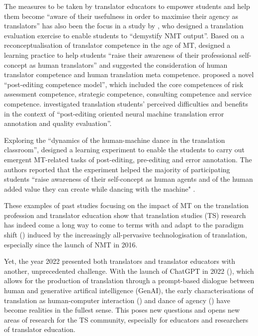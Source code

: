 \documentclass[output=paper,colorlinks,citecolor=brown]{langscibook}
\begin{document}
The measures to be taken by translator educators to empower students and help them become “aware of their usefulness in order to maximise their agency as translators” has also been the focus in a study by \citet[375--376]{Moorkens2018_expectNMT}, who designed a translation evaluation exercise to enable students to “demystify NMT output”. Based on a reconceptualisation of translator competence in the age of MT, \citet[3]{Senem2019} designed a learning practice to help students “raise their awareness of their professional self-concept as human translators” and suggested the consideration of human translator competence and human translation meta competence. \citet[248]{Nitzke2019} proposed a novel “post-editing competence model”, which included the core competences of risk assessment competence, strategic competence, consulting competence and service competence. \citet[100]{Isinsenem2021} investigated translation students’ perceived difficulties and benefits in the context of “post-editing oriented neural machine translation error annotation and quality evaluation”.

Exploring the “dynamics of the human-machine dance in the translation classroom”, \citet[377]{SenemMilufer2023} designed a learning experiment to enable the students to carry out emergent MT-related tasks of post-editing, pre-editing and error annotation. The authors reported that the experiment helped the majority of participating students “raise awareness of their self-concept as human agents and of the human added value they can create while dancing with the machine" \citep[387]{SenemMilufer2023}.

These examples of past studies focusing on the impact of MT on the translation profession and translator education show that translation studies (TS) research has indeed come a long way to come to terms with and adapt to the paradigm shift (\cite{OBrien2012}) induced by the increasingly all-pervasive technologisation of translation, especially since the launch of NMT in 2016.

Yet, the year 2022 presented both translators and translator educators with another, unprecedented challenge. With the launch of ChatGPT in 2022 (\citeauthor{openai_text}), which allows for the production of translation through a prompt-based dialogue between human and generative artifical intelligence (GenAI), the early characterisations of translation as human-computer interaction (\cite{OBrien2012}) and dance of agency (\cite{olohan_translators_2011}) have become realities in the fullest sense. This poses new questions and opens new areas of research for the TS community, especially for educators and researchers of translator education.
\end{document}
